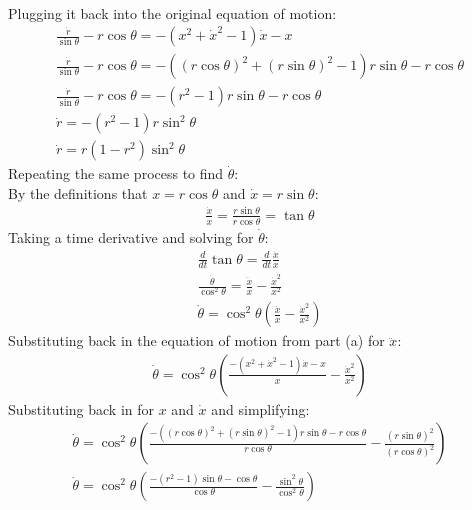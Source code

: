 \documentclass[12pt]{article}
\begin{document}
\begin{enumerate}
\begin{enumerate}
\begin{gather*}
            \end{gather*}
            Plugging it back into the original equation of motion:
            \begin{gather*}
                \frac{\dot{r}}{\sin\theta}-r\cos\theta=-\left(x^2+\dot{x}^2-1\right)\dot{x}-x\\
                \frac{\dot{r}}{\sin\theta}-r\cos\theta=-\left((r\cos\theta)^2+(r\sin\theta)^2-1\right)r\sin\theta-r\cos\theta\\
                \frac{\dot{r}}{\sin\theta}-r\cos\theta=-\left(r^2-1\right)r\sin\theta-r\cos\theta\\
                \dot{r}=-\left(r^2-1\right)r\sin^2\theta\\
                \dot{r}=r\left(1-r^2\right)\sin^2\theta
            \end{gather*}
            Repeating the same process to find $\dot{\theta}$:\\
            By the definitions that $x=r\cos\theta$ and $\dot{x}=r\sin\theta$:
            \begin{gather*}
                \frac{\dot{x}}{x}=\frac{r\sin\theta}{r\cos\theta}=\tan{\theta}
            \end{gather*}
            Taking a time derivative and solving for $\dot{\theta}$:
            \begin{gather*}
                \frac{d}{dt}\tan{\theta}=\frac{d}{dt}\frac{\dot{x}}{x}\\
                \frac{\dot{\theta}}{\cos^2{\theta}}=\frac{\ddot{x}}{x}-\frac{\dot{x}^2}{x^2}\\
                \dot{\theta}=\cos^2{\theta}\left(\frac{\ddot{x}}{x}-\frac{\dot{x}^2}{x^2}\right)
            \end{gather*}
            Substituting back in the equation of motion from part (a) for $\ddot{x}$:
            \begin{gather*}
                \dot{\theta}=\cos^2{\theta}\left(\frac{-\left(x^2+\dot{x}^2-1\right)\dot{x}-x}{x}-\frac{\dot{x}^2}{x^2}\right)
            \end{gather*}
            Substituting back in for $x$ and $\dot{x}$ and simplifying:
            \begin{gather*}
                \dot{\theta}=\cos^2{\theta}\left(\frac{-\left((r\cos\theta)^2+(r\sin\theta)^2-1\right)r\sin\theta-r\cos\theta}{r\cos\theta}-\frac{(r\sin\theta)^2}{(r\cos\theta)^2}\right)\\
                \dot{\theta}=\cos^2{\theta}\left(\frac{-\left(r^2-1\right)\sin\theta-\cos\theta}{\cos\theta}-\frac{\sin^2\theta}{\cos^2\theta}\right)\\

\end{gather*}
\end{enumerate}
\end{enumerate}
\end{document}
